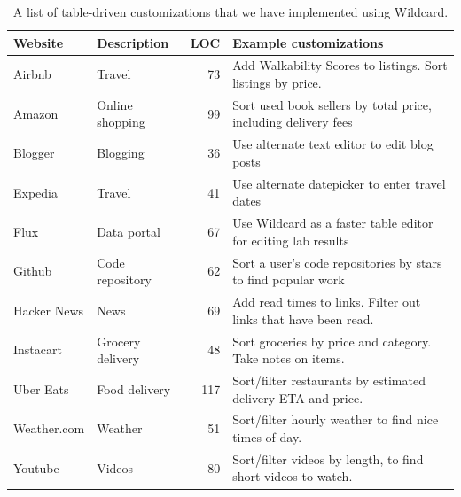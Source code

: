\documentclass[sigplan,10pt,anonymous,review]{acmart}
\begin{document}
\begin{table}[]
\begin{tabular}{llrl}
\hline
\textbf{Website} & \textbf{Description} & \textbf{LOC} & \textbf{Example customizations}                                                              \\ \hline
Airbnb           & Travel               & 73                                       & Add Walkability Scores to listings. Sort listings by price.                           \\
Amazon           & Online shopping      & 99                                       & Sort used book sellers by total price, including delivery fees                                \\
Blogger          & Blogging             & 36                                       & Use alternate text editor to edit blog posts                                                 \\
Expedia          & Travel               & 41                                       & Use alternate datepicker to enter travel dates                                               \\
Flux             & Data portal          & 67                                       & Use Wildcard as a faster table editor for editing lab results                                \\
Github           & Code repository      & 62                                       & Sort a user's code repositories by stars to find popular work                                \\
Hacker News      & News                 & 69                                       & Add read times to links. Filter out links that have been read. \\
Instacart        & Grocery delivery     & 48                                       & Sort groceries by price and category. Take notes on items.                                   \\
Uber Eats        & Food delivery        & 117                                      & Sort/filter restaurants by estimated delivery ETA and price.                                 \\
Weather.com  & Weather              & 51                                       & Sort/filter hourly weather to find nice times of day.                                        \\
Youtube          & Videos               & 80                                       & Sort/filter videos by length, to find short videos to watch.                                 \\ \hline
\end{tabular}
\caption{A list of table-driven customizations that we have implemented using Wildcard.}
\label{tab:websites}
\end{table}
\end{document}
